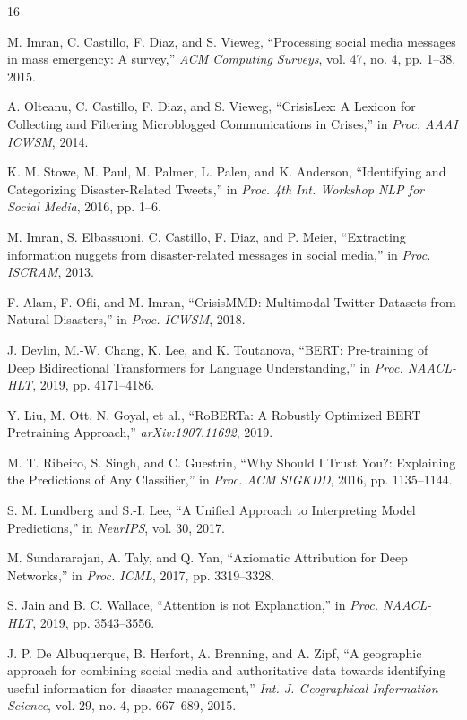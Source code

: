 \documentclass[pdflatex,sn-mathphys-num]{sn-jnl}
\theoremstyle{thmstyleone}%
\theoremstyle{thmstyletwo}%
\theoremstyle{thmstylethree}%
\begin{document}
\begin{thebibliography}{16}

M. Imran, C. Castillo, F. Diaz, and S. Vieweg, ``Processing social media messages in mass emergency: A survey,'' \textit{ACM Computing Surveys}, vol. 47, no. 4, pp. 1--38, 2015.

A. Olteanu, C. Castillo, F. Diaz, and S. Vieweg, ``CrisisLex: A Lexicon for Collecting and Filtering Microblogged Communications in Crises,'' in \textit{Proc. AAAI ICWSM}, 2014.

K. M. Stowe, M. Paul, M. Palmer, L. Palen, and K. Anderson, ``Identifying and Categorizing Disaster-Related Tweets,'' in \textit{Proc. 4th Int. Workshop NLP for Social Media}, 2016, pp. 1--6.

M. Imran, S. Elbassuoni, C. Castillo, F. Diaz, and P. Meier, ``Extracting information nuggets from disaster-related messages in social media,'' in \textit{Proc. ISCRAM}, 2013.

F. Alam, F. Ofli, and M. Imran, ``CrisisMMD: Multimodal Twitter Datasets from Natural Disasters,'' in \textit{Proc. ICWSM}, 2018.

J. Devlin, M.-W. Chang, K. Lee, and K. Toutanova, ``BERT: Pre-training of Deep Bidirectional Transformers for Language Understanding,'' in \textit{Proc. NAACL-HLT}, 2019, pp. 4171--4186.

Y. Liu, M. Ott, N. Goyal, et al., ``RoBERTa: A Robustly Optimized BERT Pretraining Approach,'' \textit{arXiv:1907.11692}, 2019.

M. T. Ribeiro, S. Singh, and C. Guestrin, ``Why Should I Trust You?: Explaining the Predictions of Any Classifier,'' in \textit{Proc. ACM SIGKDD}, 2016, pp. 1135--1144.

S. M. Lundberg and S.-I. Lee, ``A Unified Approach to Interpreting Model Predictions,'' in \textit{NeurIPS}, vol. 30, 2017.

M. Sundararajan, A. Taly, and Q. Yan, ``Axiomatic Attribution for Deep Networks,'' in \textit{Proc. ICML}, 2017, pp. 3319--3328.

S. Jain and B. C. Wallace, ``Attention is not Explanation,'' in \textit{Proc. NAACL-HLT}, 2019, pp. 3543--3556.

J. P. De Albuquerque, B. Herfort, A. Brenning, and A. Zipf, ``A geographic approach for combining social media and authoritative data towards identifying useful information for disaster management,'' \textit{Int. J. Geographical Information Science}, vol. 29, no. 4, pp. 667--689, 2015.


\end{thebibliography}
\end{document}
